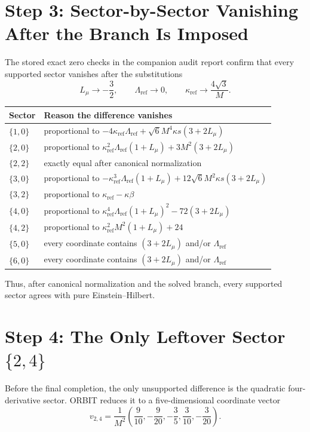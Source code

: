 \documentclass[11pt]{article}
\newcommand{\Lmu}{L_\mu}
\begin{document}
\section{Step 3: Sector-by-Sector Vanishing After the Branch Is Imposed}

The stored exact zero checks in the companion audit report confirm that every supported sector vanishes after the substitutions
\[
\Lmu\to -\frac32,
\qquad
\Lambda_{\mathrm{ref}}\to 0,
\qquad
\kappa_{\mathrm{ref}}\to \frac{4\sqrt3}{M}.
\]

\begin{longtable}{@{}>{\raggedright\arraybackslash}p{1.3in}>{\raggedright\arraybackslash}p{4.8in}@{}}
\toprule
Sector & Reason the difference vanishes \\
\midrule
\endhead
$\{1,0\}$ & proportional to $-4\kappa_{\mathrm{ref}}\Lambda_{\mathrm{ref}}+\sqrt6 M^4\kappa s(3+2\Lmu)$ \\[3pt]
$\{2,0\}$ & proportional to $\kappa_{\mathrm{ref}}^2\Lambda_{\mathrm{ref}}(1+\Lmu)+3M^2(3+2\Lmu)$ \\[3pt]
$\{2,2\}$ & exactly equal after canonical normalization \\[3pt]
$\{3,0\}$ & proportional to $-\kappa_{\mathrm{ref}}^3\Lambda_{\mathrm{ref}}(1+\Lmu)+12\sqrt6 M^2\kappa s(3+2\Lmu)$ \\[3pt]
$\{3,2\}$ & proportional to $\kappa_{\mathrm{ref}}-\kappa\beta$ \\[3pt]
$\{4,0\}$ & proportional to $\kappa_{\mathrm{ref}}^4\Lambda_{\mathrm{ref}}(1+\Lmu)^2-72(3+2\Lmu)$ \\[3pt]
$\{4,2\}$ & proportional to $\kappa_{\mathrm{ref}}^2M^2(1+\Lmu)+24$ \\[3pt]
$\{5,0\}$ & every coordinate contains $(3+2\Lmu)$ and/or $\Lambda_{\mathrm{ref}}$ \\[3pt]
$\{6,0\}$ & every coordinate contains $(3+2\Lmu)$ and/or $\Lambda_{\mathrm{ref}}$ \\[3pt]
\bottomrule
\end{longtable}

Thus, after canonical normalization and the solved branch, every supported sector agrees with pure Einstein--Hilbert.

\section{Step 4: The Only Leftover Sector \texorpdfstring{$\{2,4\}$}{\{2,4\}}}

Before the final completion, the only unsupported difference is the quadratic four-derivative sector. ORBIT reduces it to a five-dimensional coordinate vector
\begin{equation}
v_{2,4}
=
\frac{1}{M^2}
\left(
\frac{9}{10},
-\frac{9}{20},
-\frac35,
\frac{3}{10},
-\frac{3}{20}
\right).
\end{equation}
\end{document}
